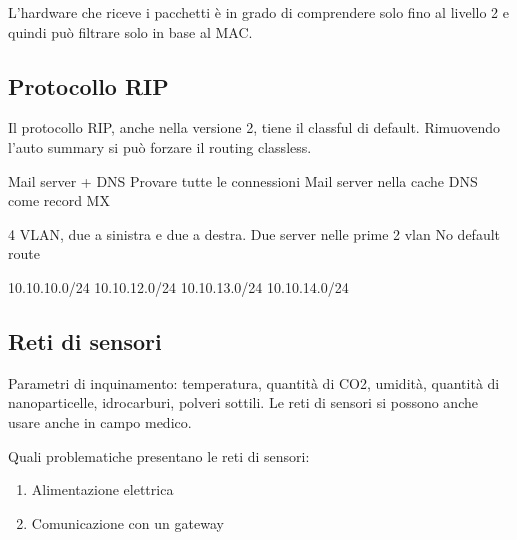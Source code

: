 \documentclass{article}
\begin{document}
    L'hardware che riceve i pacchetti è in grado di comprendere solo fino al livello 2 e quindi può filtrare solo in base al MAC.

    \subsection{Protocollo RIP}
    Il protocollo RIP, anche nella versione 2, tiene il classful di default.
    Rimuovendo l'auto summary si può forzare il routing classless.

    Mail server + DNS
    Provare tutte le connessioni
    Mail server nella cache DNS come record MX

    4 VLAN, due a sinistra e due a destra.
    Due server nelle prime 2 vlan
    No default route

    10.10.10.0/24
    10.10.12.0/24
    10.10.13.0/24
    10.10.14.0/24

    \subsection{Reti di sensori}
    Parametri di inquinamento: temperatura, quantità di CO2, umidità, quantità di nanoparticelle, idrocarburi, polveri sottili.
    Le reti di sensori si possono anche usare anche in campo medico.

    Quali problematiche presentano le reti di sensori:
    \begin{enumerate}
        \item Alimentazione elettrica
        \item Comunicazione con un gateway
    \end{enumerate}
\end{document}
